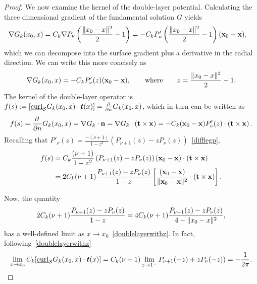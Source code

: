 \begin{proof}
We now examine the kernel of the double-layer potential. Calculating the
three dimensional gradient of the fundamental solution $G$ yields
\begin{align*}
  \nabla G_k(x_0,x) &= C_k \nabla P_\nu\left(
    \frac{\|x_0-x\|^2}{2}-1\right) = 
  -C_k P'_\nu\left(\frac{\|x_0-x\|^2}{2}-1\right)
    (\mathbf{x}_{0}-\mathbf{x}),
\end{align*}
which we can decompose into the surface gradient plus a derivative in
the radial direction. We can write this more concisely as
\begin{align*}
\nabla G_k(x_0,x)=-C_k P'_{\nu}(z) (\mathbf{x}_0-\mathbf{x}), 
  \qquad \mbox{where}\qquad z=\frac{\|{ x_0}-{x}\|^2}{2}-1.
\end{align*} 
The kernel of the double-layer operator is $f(s): =
[\underline{\mbox{curl}}_{\S}G_{k}(x_{0},x) \cdot \vec{t}(x)]=
\frac{\partial}{\partial n} G_k({x}_{0},{x})$, which in turn can be
written as 
\begin{align*}
 f(s)=\frac{\partial \, }{\partial n} G_{k}(x_{0},x) 
 =\nabla G_{k} \cdot \mathbf{n} = \nabla G_k\cdot \left( \mathbf{t}
 \times \mathbf{x} \right) 
 =-C_k (\mathbf{x}_0-\mathbf{x})P'_{\nu}(z)\cdot \left(
 \mathbf{t} \times \mathbf{x} \right).
\end{align*}
Recalling that $P'_{\nu}(z)=\frac{-(\nu+1)}{1-z^2}(P_{\nu+1}(z)-z
P_{\nu}(z))$~\eqref{difflegp},
\begin{align}
  f(s) &= C_k \frac{(\nu+1)}{1-z^2}\left(
  P_{\nu+1}(z)-zP_{\nu}(z)\right) 
  (\mathbf{x}_0-\mathbf{x})\cdot \left(
  \mathbf{t} \times {\mathbf x} \right) \nonumber\\
  &= 2C_k(\nu+1)\frac{P_{\nu+1}(z)-zP_{\nu}(z)}{1-z} \left[
  \frac{(\mathbf{x}_0-\mathbf{x})}{\|\mathbf{x}_{0}-\mathbf{x}\|^2}
  \cdot \left( \mathbf{t} \times \mathbf{x} \right)\right].
  \label{kern1}
\end{align} 

Now, the quantity
\begin{align*}
  2C_k(\nu+1)\frac{P_{\nu+1}(z)-zP_{\nu}(z)}{1-z}
  =4C_k(\nu+1)\frac{P_{\nu+1}(z)-zP_{\nu}(z)}{4-\|{x_0}-{x}\|^2},
\end{align*}
has a well-defined limit as $x \rightarrow
x_{0}$~\eqref{doublelayerwithz}. In fact,
following~\eqref{doublelayerwithz}
\begin{align*}
  \lim_{x\rightarrow x_0} 
  \C[\underline{\mbox{curl}}_{\S}G_{k}(x_{0},x) \cdot \vec{t}(x)] 
  = \C(\nu+1)\lim_{z\rightarrow 1^-}
  P_{\nu+1}(-z)+zP_{\nu}(-z)) = -\frac{1}{2\pi}.
\end{align*}


\end{proof}
